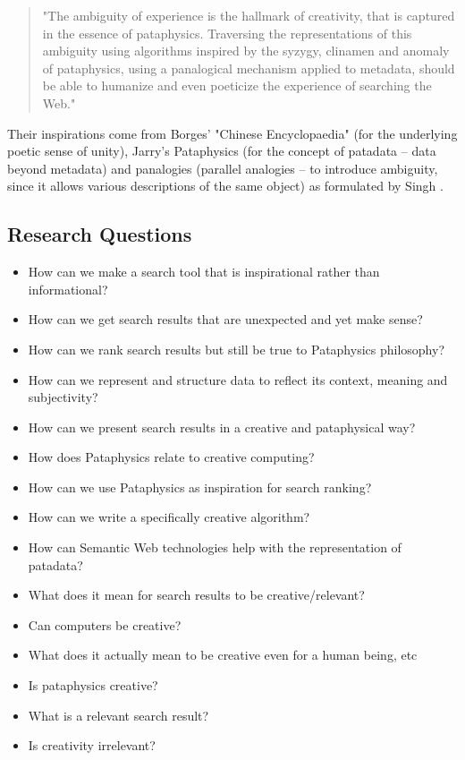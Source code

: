 \begin{quote}
  "The ambiguity of experience is the hallmark of creativity, that is captured in the essence of pataphysics. Traversing the representations of this ambiguity using algorithms inspired by the syzygy, clinamen and anomaly of pataphysics, using a panalogical mechanism applied to metadata, should be able to humanize and even poeticize the experience of searching the Web." \citep{Hendler2013}
\end{quote}

Their inspirations come from Borges' "Chinese Encyclopaedia" \citep{Borges2000} (for the underlying poetic sense of unity), Jarry's Pataphysics \citep{Jarry1996} (for the concept of patadata – data beyond metadata) and  panalogies (parallel analogies – to introduce ambiguity, since it allows various descriptions of the same object) as formulated by Singh \citep{Singh2005}.

\subsection{Research Questions}

\begin{itemize}
  \item How can we make a search tool that is inspirational rather than informational?
  \item How can we get search results that are unexpected and yet make sense?
  \item How can we rank search results but still be true to Pataphysics philosophy?
  \item How can we represent and structure data to reflect its context, meaning and subjectivity?
  \item How can we present search results in a creative and pataphysical way?
  \item How does Pataphysics relate to creative computing?
  \item How can we use Pataphysics as inspiration for search ranking?
  \item How can we write a specifically creative algorithm?
  \item How can Semantic Web technologies help with the representation of patadata?
  \item What does it mean for search results to be creative/relevant?
  \item Can computers be creative?
  \item What does it actually mean to be creative even for a human being, etc
  \item Is pataphysics creative?
  \item What is a relevant search result?
  \item Is creativity irrelevant?
\end{itemize}


